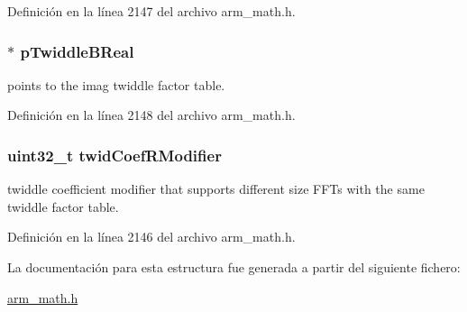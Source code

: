 Definición en la línea 2147 del archivo arm\+\_\+math.\+h.

\subsubsection[{\texorpdfstring{p\+Twiddle\+B\+Real}{pTwiddleBReal}}]{$\ast$ p\+Twiddle\+B\+Real}\hypertarget{structarm__rfft__instance__q15_a67a618de57c3a7420ee05fda1a80bf3a}{}\label{structarm__rfft__instance__q15_a67a618de57c3a7420ee05fda1a80bf3a}
points to the imag twiddle factor table. 

Definición en la línea 2148 del archivo arm\+\_\+math.\+h.

\subsubsection[{\texorpdfstring{twid\+Coef\+R\+Modifier}{twidCoefRModifier}}]{\setlength{\rightskip}{0pt plus 5cm}uint32\+\_\+t twid\+Coef\+R\+Modifier}\hypertarget{structarm__rfft__instance__q15_a5b06f7f76c018db993fe6acc5708c589}{}\label{structarm__rfft__instance__q15_a5b06f7f76c018db993fe6acc5708c589}
twiddle coefficient modifier that supports different size F\+F\+Ts with the same twiddle factor table. 

Definición en la línea 2146 del archivo arm\+\_\+math.\+h.



La documentación para esta estructura fue generada a partir del siguiente fichero\+:\begin{DoxyCompactItemize}
\item 
\hyperlink{arm__math_8h}{arm\+\_\+math.\+h}\end{DoxyCompactItemize}
